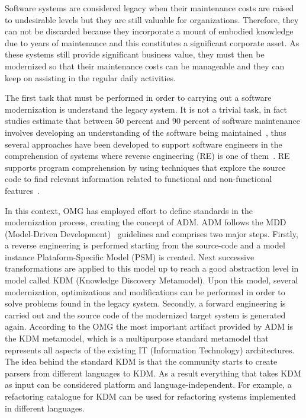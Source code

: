 Software systems are considered legacy when their maintenance costs are raised to undesirable levels but they are still valuable for organizations. Therefore, they can not be discarded because they incorporate a mount of embodied knowledge due to years of maintenance and this constitutes a significant corporate asset. As these systems still provide significant business value, they must then be modernized so that their maintenance costs can be manageable and they can keep on assisting in the regular daily activities. 

The first task that must be performed in order to carrying out a software modernization is understand the legacy system. It is not a trivial task, in fact studies estimate that between $50$ percent and $90$ percent of software maintenance involves developing an understanding of the software being maintained~\cite{Tilley95perspectiveson}, thus several approaches have been developed to support software engineers in the comprehension of systems where reverse engineering (RE) is one of them~\cite{Canfora2011}. RE supports program comprehension by using techniques that explore the source code to find relevant information related to functional and non-functional features~\cite{chikofskyTax}.

In this context, OMG has employed effort to define standards in the modernization process, creating the concept of ADM. ADM follows the MDD (Model-Driven Development)~\cite{5440163} guidelines and comprises two major steps. Firstly, a reverse engineering is performed starting from the source-code and a model instance Plataform-Specific Model (PSM) is created. Next successive transformations are applied to this model up to reach a good abstraction level in model called KDM (Knowledge Discovery Metamodel). Upon this model, several modernization, optimizations and modifications can be performed in order to solve problems found in the legacy system. Secondly, a forward engineering is carried out and the source code of the modernized target system is generated again. According to the OMG the most important artifact provided by ADM is the KDM metamodel, which is a multipurpose standard metamodel that represents all aspects of the existing IT (Information  Technology) architectures. The idea behind the standard KDM is that the community starts to create parsers from different languages to KDM. As a result everything that takes KDM as input can be considered platform and language-independent. For example, a refactoring catalogue for KDM can be used for refactoring systems implemented in different languages. 

